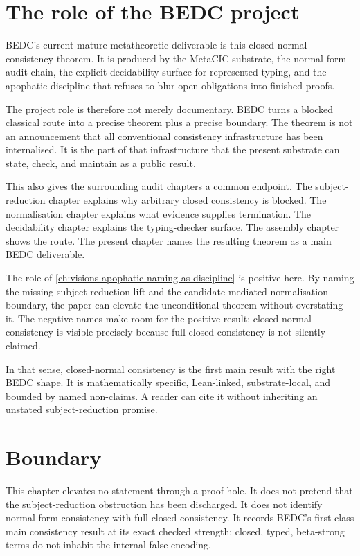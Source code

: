 \section{The role of the BEDC project}
\label{sec:closed-normal-consistency-main-result-project-role}

BEDC's current mature metatheoretic deliverable is this closed-normal
consistency theorem. It is produced by the MetaCIC substrate, the normal-form
audit chain, the explicit decidability surface for represented typing, and
the apophatic discipline that refuses to blur open obligations into finished
proofs.

The project role is therefore not merely documentary. BEDC turns a blocked
classical route into a precise theorem plus a precise boundary. The theorem is
not an announcement that all conventional consistency infrastructure has been
internalised. It is the part of that infrastructure that the present substrate
can state, check, and maintain as a public result.

This also gives the surrounding audit chapters a common endpoint. The
subject-reduction chapter explains why arbitrary closed consistency is blocked.
The normalisation chapter explains what evidence supplies termination. The
decidability chapter explains the typing-checker surface. The assembly chapter
shows the route. The present chapter names the resulting theorem as a main
BEDC deliverable.

The role of \autoref{ch:visions-apophatic-naming-as-discipline} is positive
here. By naming the missing subject-reduction lift and the candidate-mediated
normalisation boundary, the paper can elevate the unconditional theorem
without overstating it. The negative names make room for the positive result:
closed-normal consistency is visible precisely because full closed consistency
is not silently claimed.

In that sense, closed-normal consistency is the first main result with the
right BEDC shape. It is mathematically specific, Lean-linked, substrate-local,
and bounded by named non-claims. A reader can cite it without inheriting an
unstated subject-reduction promise.

\section{Boundary}
\label{sec:closed-normal-consistency-main-result-boundary}

This chapter elevates no statement through a proof hole. It does not pretend
that the subject-reduction obstruction has been discharged. It does not
identify normal-form consistency with full closed consistency. It records
BEDC's first-class main consistency result at its exact checked strength:
closed, typed, beta-strong terms do not inhabit the internal false encoding.

